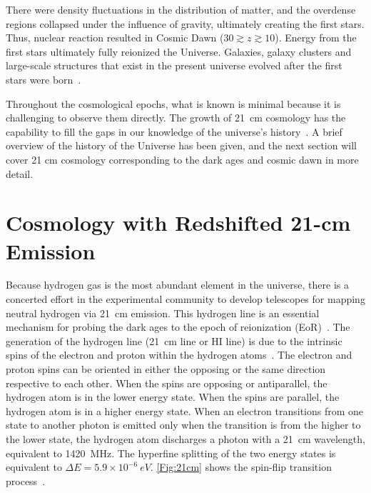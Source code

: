 	There were density fluctuations in the distribution of matter, and the overdense regions collapsed under the influence of gravity, ultimately creating the first stars. Thus, nuclear reaction resulted in Cosmic Dawn ($30\gtrsim z \gtrsim 10$). Energy from the first stars ultimately fully reionized the Universe. Galaxies, galaxy clusters and large-scale structures that exist in the present universe evolved after the first stars were born~\citep{2017arXiv170808521D, 2012AdSpR..49..433B}. 
	
	Throughout the cosmological epochs, what is known is minimal because it is challenging to observe them directly. The growth of \SI{21}{cm} cosmology has the capability to fill the gaps in our knowledge of the universe's history~\citep{2012RPPh...75h6901P}. A brief overview of the history of the Universe has been given, and the next section will cover 21 cm cosmology corresponding to the dark ages and cosmic dawn in more detail.
	           
	\section{Cosmology with Redshifted 21-cm Emission}
		
	Because hydrogen gas is the most abundant element in the universe, there is a concerted effort in the experimental community to develop telescopes for mapping neutral hydrogen via \SI{21}{cm} emission. This hydrogen line is an essential mechanism for probing the dark ages to the epoch of reionization (EoR)~\citep{2013PhRvD..87d3002L,2014ApJ...782...66P}. The generation of the hydrogen line (\SI{21}{cm} line or HI line) is due to the intrinsic spins of the electron and proton within the hydrogen atoms~\citep{book:832129}. The electron and proton spins can be oriented in either the opposing or the same direction respective to each other. When the spins are opposing or antiparallel, the hydrogen atom is in the lower energy state. When the spins are parallel, the hydrogen atom is in a higher energy state. When an electron transitions from one state to another photon is emitted only when the transition is from the higher to the lower state, the hydrogen atom discharges a photon with a \SI{21}{cm} wavelength, equivalent to \SI{1420}{MHz}. The hyperfine splitting of the two energy states is equivalent to \(\Delta E =  5.9 \times 10^{-6} \ eV\). \autoref{Fig:21cm} shows the spin-flip transition process~\citep{16, book:832129}.
	
